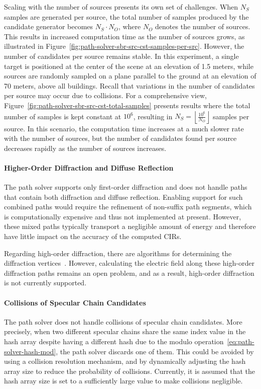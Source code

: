 Scaling with the number of sources presents its own set of challenges. When $N_S$ samples are generated per source, the total number of samples produced by the candidate generator becomes $N_S \cdot N_O$, where $N_O$ denotes the number of sources. This results in increased computation time as the number of sources grows, as illustrated in Figure~\ref{fig:path-solver-sbr-src-cst-samples-per-src}. However, the number of candidates per source remains stable. In this experiment, a single target is positioned at the center of the scene at an elevation of 1.5 meters, while sources are randomly sampled on a plane parallel to the ground at an elevation of 70 meters, above all buildings. Recall that variations in the number of candidates per source may occur due to collisions. For a comprehensive view, Figure~\ref{fig:path-solver-sbr-src-cst-total-samples} presents results where the total number of samples is kept constant at $10^6$, resulting in $N_S = \left\lfloor \frac{10^6}{N_O} \right\rfloor$ samples per source. In this scenario, the computation time increases at a much slower rate with the number of sources, but the number of candidates found per source decreases rapidly as the number of sources increases.

\paragraph{Higher-Order Diffraction and Diffuse Reflection}

The path solver supports only first-order diffraction and does not handle paths that contain both diffraction and diffuse reflection. Enabling support for such combined paths would require the refinement of non-suffix path segments, which is computationally expensive and thus not implemented at present. However, these mixed paths typically transport a negligible amount of energy and therefore have little impact on the accuracy of the computed \glspl{CIR}.

Regarding high-order diffraction, there are algorithms for determining the diffraction vertices~\cite{4200889}. However, calculating the electric field along these high-order diffraction paths remains an open problem, and as a result, high-order diffraction is not currently supported.

\paragraph{Collisions of Specular Chain Candidates}

The path solver does not handle collisions of specular chain candidates.
More precisely, when two different specular chains share the same index value in the hash array despite having a different hash due to the modulo operation~\eqref{eq:path-solver-hash-mod}, the path solver discards one of them. This could be avoided by using a collision resolution mechanism, and by dynamically adjusting the hash array size to reduce the probability of collisions.
Currently, it is assumed that the hash array size is set to a sufficiently large value to make collisions negligible.
